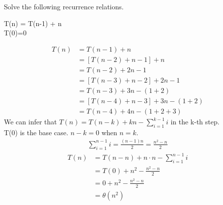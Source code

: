 \begin{prob}
    Solve the following recurrence relations.
    
    \begin{subprobset}
    
            \begin{subprob}
		        T(n) = T(n-1) + n
		        \\
		        T(0)=0
                \begin{soln}
                    \begin{align*}
                        T(n) &= T(n-1) + n
                        \\
                        &= [T(n-2) + n-1] + n
                        \\
                        &= T(n-2) + 2n - 1
                        \\	
                        &= [T(n-3) + n-2] + 2n - 1
                        \\
                        &= T(n-3) + 3n - (1 + 2)
                        \\
                        &= [T(n-4) + n -3] + 3n - (1+2)
                        \\
                        &= T(n-4) + 4n - (1+2+3)
                    \end{align*}
                    We can infer that $T(n) = T(n - k) + kn - \sum_{i=1}^{k-1}i$ in the k-th step. 
                    \\
                    T(0) is the base case. $n-k =0 $ when $n=k$.
                    \\
                    \begin{align*}
                        \sum_{i=1}^{n-1}i = \frac{(n-1)n}{2} = \frac{n^2 - n}{2}
                    \end{align*}
                    \begin{align*}
                        T(n) &= T(n-n) + n\cdot n - \sum_{i=1}^{n-1}i 
                        \\
                        &= T(0) + n^2 -  \frac{n^2 - n}{2}
                        \\
                        &= 0 + n^2 -  \frac{n^2 - n}{2}
                        \\  
                        &= \theta(n^2)
                    \end{align*} 
                \end{soln}
            \end{subprob}
            

\end{subprobset}
\end{prob}
